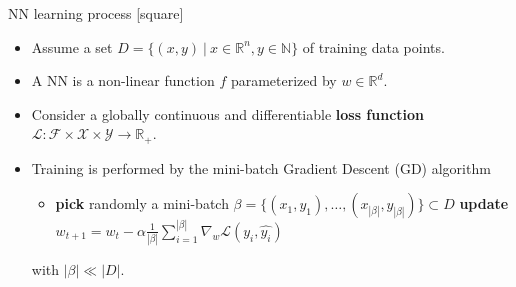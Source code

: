 \begin{frame}{NN learning process}
    [square]
    \begin{itemize}
        \item{Assume a set $D=\{(x,y)\:|\:x\in\mathbb{R}^n,y\in\mathbb{N}\}$ of training data points.}
        \vspace{0.3cm}
        \item{A NN is a non-linear function $f$ parameterized by $w\in\mathbb{R}^d$.}
        \vspace{0.3cm}
        \item{Consider a globally continuous and differentiable \textbf{loss function} $\mathcal{L}:\mathcal{F}\times\mathcal{X}\times\mathcal{Y}\rightarrow\mathbb{R}_+$.}
        \vspace{0.3cm}
        \item{Training is performed by the mini-batch Gradient Descent (GD) algorithm
        \begin{itemize}
            \item[]{
            \begin{algorithm}[H]
                \begin{algorithmic}[1]
                    \STATE \textbf{pick} randomly a mini-batch $\beta=\{(x_1,y_1),\dots,(x_{|\beta|},y_{|\beta|})\} \subset D$
                    \STATE \textbf{update} $w_{t+1}=w_t-\alpha\frac{1}{|\beta|}\sum_{i=1}^{|\beta|}\nabla_w\mathcal{L}(y_i,\hat{y_i})$
                    \ENDWHILE
                \end{algorithmic}
                \label{alg:gd}
            \end{algorithm}
            }
        \end{itemize}
        with $|\beta| \ll |D|$.}
    \end{itemize}
\end{frame}

